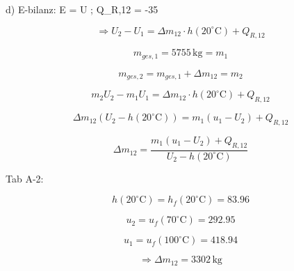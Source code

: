 d) E-bilanz: \quad \Delta E = \Delta U \quad ; \quad Q_{R,12} = -35 \, 

\[
\Rightarrow U_2 - U_1 = \Delta m_{12} \cdot h(20^\circ \text{C}) + Q_{R,12}
\]

\[
m_{ges,1} = 5755 \, \text{kg} = m_1
\]

\[
m_{ges,2} = m_{ges,1} + \Delta m_{12} = m_2
\]

\[
m_2 U_2 - m_1 U_1 = \Delta m_{12} \cdot h(20^\circ \text{C}) + Q_{R,12}
\]

\[
\Delta m_{12} (U_2 - h(20^\circ \text{C})) = m_1 (u_1 - U_2) + Q_{R,12}
\]

\[
\Delta m_{12} = \frac{m_1 (u_1 - U_2) + Q_{R,12}}{U_2 - h(20^\circ \text{C})}
\]

Tab A-2:

\[
h(20^\circ \text{C}) = h_f(20^\circ \text{C}) = 83.96
\]

\[
u_2 = u_f(70^\circ \text{C}) = 292.95
\]

\[
u_1 = u_f(100^\circ \text{C}) = 418.94
\]

\[
\Rightarrow \Delta m_{12} = 3302 \, \text{kg}
\]